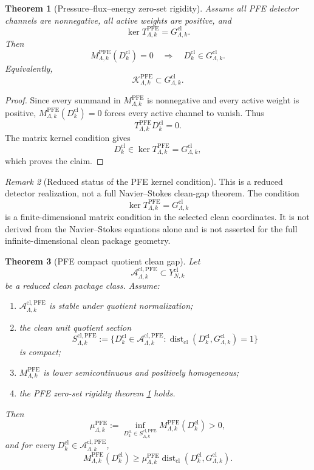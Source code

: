 \documentclass[11pt]{article}
\numberwithin{equation}{section}
\theoremstyle{plain}
\newtheorem{theorem}{Theorem}[section]
\theoremstyle{definition}
\theoremstyle{remark}
\newtheorem{remark}[theorem]{Remark}
\newcommand{\cl}{\mathrm{cl}}
\newcommand{\Dist}{\operatorname{dist}}
\newcommand{\A}{\mathcal A}
\newcommand{\K}{\mathcal K}
\begin{document}
\begin{theorem}[Pressure--flux--energy zero-set rigidity]\label{thm:pfe-zero-rigidity}
Assume all PFE detector channels are nonnegative, all active weights are
positive, and
\[
  \ker T_{\Lambda,k}^{\mathrm{PFE}}=G_{\Lambda,k}^{\cl}.
\]
Then
\[
  M_{\Lambda,k}^{\mathrm{PFE}}(D_k^{\cl})=0
  \quad\Longrightarrow\quad
  D_k^{\cl}\in G_{\Lambda,k}^{\cl}.
\]
Equivalently,
\[
  \K_{\Lambda,k}^{\mathrm{PFE}}\subset G_{\Lambda,k}^{\cl}.
\]
\end{theorem}

\begin{proof}
Since every summand in \(M_{\Lambda,k}^{\mathrm{PFE}}\) is nonnegative and
every active weight is positive, \(M_{\Lambda,k}^{\mathrm{PFE}}(D_k^{\cl})=0\)
forces every active channel to vanish.  Thus
\[
  T_{\Lambda,k}^{\mathrm{PFE}}D_k^{\cl}=0.
\]
The matrix kernel condition gives
\[
  D_k^{\cl}\in\ker T_{\Lambda,k}^{\mathrm{PFE}}=G_{\Lambda,k}^{\cl},
\]
which proves the claim.
\end{proof}

\begin{remark}[Reduced status of the PFE kernel condition]
This is a reduced detector realization, not a full Navier--Stokes clean-gap
theorem.  The condition
\[
  \ker T_{\Lambda,k}^{\mathrm{PFE}}=G_{\Lambda,k}^{\cl}
\]
is a finite-dimensional matrix condition in the selected clean coordinates.
It is not derived from the Navier--Stokes equations alone and is not asserted
for the full infinite-dimensional clean package geometry.
\end{remark}

\begin{theorem}[PFE compact quotient clean gap]\label{thm:pfe-clean-gap}
Let
\[
  \A_{\Lambda,k}^{\cl,\mathrm{PFE}}\subset Y_{N,k}^{\cl}
\]
be a reduced clean package class.  Assume:
\begin{enumerate}[label=(\alph*)]
  \item \(\A_{\Lambda,k}^{\cl,\mathrm{PFE}}\) is stable under quotient
  normalization;
  \item the clean unit quotient section
  \[
    S_{\Lambda,k}^{\cl,\mathrm{PFE}}
    :=
    \{D_k^{\cl}\in\A_{\Lambda,k}^{\cl,\mathrm{PFE}}:
      \Dist_{\cl}(D_k^{\cl},G_{\Lambda,k}^{\cl})=1\}
  \]
  is compact;
  \item \(M_{\Lambda,k}^{\mathrm{PFE}}\) is lower semicontinuous and
  positively homogeneous;
  \item the PFE zero-set rigidity theorem \cref{thm:pfe-zero-rigidity}
  holds.
\end{enumerate}
Then
\[
  \mu_{\Lambda,k}^{\mathrm{PFE}}
  :=
  \inf_{D_k^{\cl}\in S_{\Lambda,k}^{\cl,\mathrm{PFE}}}
  M_{\Lambda,k}^{\mathrm{PFE}}(D_k^{\cl})>0,
\]
and for every \(D_k^{\cl}\in\A_{\Lambda,k}^{\cl,\mathrm{PFE}}\),
\[
  M_{\Lambda,k}^{\mathrm{PFE}}(D_k^{\cl})
  \ge
  \mu_{\Lambda,k}^{\mathrm{PFE}}
  \Dist_{\cl}(D_k^{\cl},G_{\Lambda,k}^{\cl}).
\]
\end{theorem}
\end{document}
